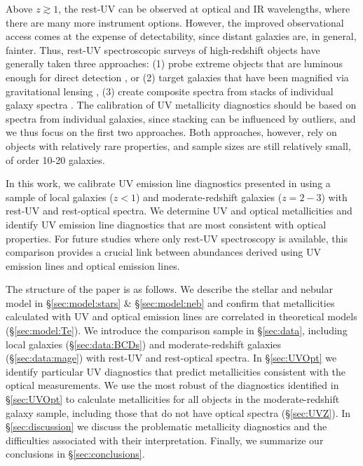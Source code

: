 \documentclass[preprint2]{aastex62}
\begin{document}
Above $z\gtrsim 1$, the rest-UV can be observed at optical and IR wavelengths, where there are many more instrument options. However, the improved observational access comes at the expense of detectability, since distant galaxies are, in general, fainter. Thus, rest-UV spectroscopic surveys of high-redshift objects have generally taken three approaches: (1) probe extreme objects that are luminous enough for direct detection \citep[e.g., ][]{Erb+2010, Stark+2014}, or (2) target galaxies that have been magnified via gravitational lensing \citep[e.g.,][]{Rigby+2018a}, (3) create composite spectra from stacks of individual galaxy spectra \citep[e.g.,][]{Shapley+2003, Steidel+2016}. The calibration of UV metallicity diagnostics should be based on spectra from individual galaxies, since stacking can be influenced by outliers, and we thus focus on the first two approaches. Both approaches, however, rely on objects with relatively rare properties, and sample sizes are still relatively small, of order 10-20 galaxies. 

In this work, we calibrate UV emission line diagnostics presented in \citet{Byler+2018} using a sample of local galaxies ($z < 1$) and moderate-redshift galaxies ($z=2-3$) with rest-UV and rest-optical spectra.
We determine UV and optical metallicities and identify UV emission line diagnostics that are most consistent with optical properties. For future studies where only rest-UV spectroscopy is available, this comparison provides a crucial link between abundances derived using UV emission lines and optical emission lines.

The structure of the paper is as follows. We describe the stellar and nebular model in \S\ref{sec:model:stars} \& \S\ref{sec:model:neb} and confirm that metallicities calculated with UV and optical emission lines are correlated in theoretical models (\S\ref{sec:model:Te}). We introduce the comparison sample in \S\ref{sec:data}, including local galaxies (\S\ref{sec:data:BCDs}) and moderate-redshift galaxies (\S\ref{sec:data:mage}) with rest-UV and rest-optical spectra. In \S\ref{sec:UVOpt} we identify particular UV diagnostics that predict metallicities consistent with the optical measurements. We use the most robust of the diagnostics identified in \S\ref{sec:UVOpt} to calculate metallicities for all objects in the moderate-redshift galaxy sample, including those that do not have optical spectra (\S\ref{sec:UVZ}). In \S\ref{sec:discussion} we discuss the problematic metallicity diagnostics and the difficulties associated with their interpretation. Finally, we summarize our conclusions in \S\ref{sec:conclusions}.
\end{document}

